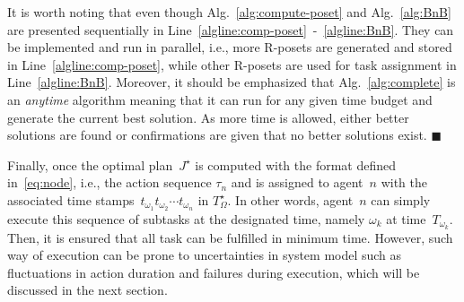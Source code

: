 \begin{remark}\label{remark:parallel}
It is worth noting that even though Alg.~\ref{alg:compute-poset} and
Alg.~\ref{alg:BnB} are presented sequentially in
Line~\ref{algline:comp-poset}~-~\ref{algline:BnB}.
They can be implemented and run {in parallel}, i.e., more R-posets are
generated and stored in Line~\ref{algline:comp-poset},
while other R-posets are used for task assignment in Line~\ref{algline:BnB}.
Moreover, it should be emphasized that Alg.~\ref{alg:complete} is an \emph{anytime}
algorithm meaning that it can run for any given time budget and generate the
current best solution.
As more time is allowed, either better solutions are found or confirmations are
given that no better solutions exist.
\hfill  $\blacksquare$
\end{remark}




Finally, once the optimal plan~$J^\star$ is computed with the format
defined in~\eqref{eq:node}, i.e.,
the action sequence $\tau_n$ and is assigned
to agent~$n$ with the associated time stamps~$t_{\omega_1}t_{\omega_2}\cdots t_{\omega_n}$ in $T^\star_\Omega$.
In other words,
agent~$n$ can simply execute this sequence of subtasks at the designated time,
namely $\omega_k$ at time~$T_{\omega_k}$.
Then, it is ensured that all task can be fulfilled in minimum time.
However, such way of execution can be prone to uncertainties in system model
such as fluctuations in action duration
and failures during execution, which will be discussed in the next section.
